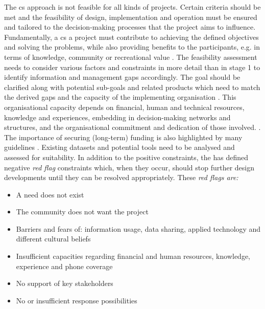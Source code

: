 The \acrlong{cs} approach is not feasible for all kinds of projects. Certain criteria should be met and the feasibility of design, implementation and operation must be ensured and tailored to the decision-making processes that the project aims to influence. Fundamentally, a \acrshort{cs} a project must contribute to achieving the defined objectives and solving the problems, while also providing benefits to the participants, e.g. in terms of knowledge, community or recreational value \autocite{escaeuropeancitizenscienceassociationTenPrinciplesCitizen2015,fraislCitizenScienceEnvironmental2022}. The feasibility assessment needs to consider various factors and constraints in more detail than in stage 1 to identify information and management gaps accordingly. The goal should be clarified along with potential sub-goals and related products which need to match the derived gaps and the capacity of the implementing organisation \autocite{ifrcCommunityBasedSurveillanceGuiding2017,minkmanCitizenScienceWater2015}. This organisational capacity depends on financial, human and technical resources, knowledge and experiences, embedding in decision-making networks and structures, and the organisational commitment and dedication of those involved. \autocite{fraislCitizenScienceEnvironmental2022,ifrcCommunityBasedSurveillanceGuiding2017}. The importance of securing (long-term) funding is also highlighted by many guidelines \autocite{cervoniImplementingIntegratedWater2008,minkmanCitizenScienceWater2015,sharpeCommunityBasedEcological2006, whitelawEstablishingCanadianCommunity2003}. Existing datasets and potential tools need to be analysed and assessed for suitability. In addition to the positive constraints, the \autocite{ ifrcCommunityBasedSurveillanceGuiding2017} has defined negative \textit{red flag} constraints which, when they occur, should stop further design developments until they can be resolved appropriately. These \textit{red flags are:}

\begin{itemize}
    \item A need does not exist
    \item The community does not want the project
    \item Barriers and fears of: information usage, data sharing, applied technology and different cultural beliefs
    \item Insufficient capacities regarding financial and human resources, knowledge, experience and phone coverage
    \item No support of key stakeholders
    \item No or insufficient response possibilities
\end{itemize}

